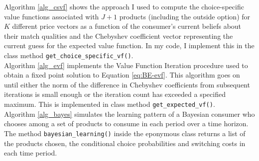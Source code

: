 \documentclass[11pt]{article}
\begin{document}
\noindent Algorithm \ref{alg_csvf} shows the approach I used to compute the choice-specific value functions associated with $J + 1$ products (including the outside option) for $K$ different price vectors as a function of the consumer's current beliefs about their match qualities and the Chebyshev coefficient vector representing the current guess for the expected value function. In my code, I implement this in the class method \verb|get_choice_specific_vf()|.\\

\noindent Algorithm \ref{alg_evf} implements the Value Function Iteration procedure used to obtain a fixed point solution to Equation \ref{eq:BE-evf}. This algorithm goes on until either the norm of the difference in Chebyshev coefficients from subsequent iterations is small enough or the iteration count has exceeded a specified maximum. This is implemented in class method \verb|get_expected_vf()|. \\

\noindent Algorithm \ref{alg_bayes} simulates the learning pattern of a Bayesian consumer who chooses among a set of products to consume in each period over a time horizon. The method \verb|bayesian_learning()| inside the eponymous class returns a list of the products chosen, the conditional choice probabilities and switching costs in each time period.

{
\newpage
\printbibliography}

\newpage 

\appendix
\end{document}
